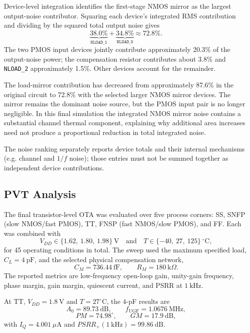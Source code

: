 Device-level integration identifies the first-stage NMOS mirror as the
largest output-noise contributor. Squaring each device's integrated
RMS contribution and dividing by the squared total output noise gives
\[
\underbrace{38.0\%}_{\texttt{NLOAD\_1}}+
\underbrace{34.8\%}_{\texttt{NLOAD\_0}}
\approx72.8\%.
\]
The two PMOS input devices jointly contribute approximately 20.3\%
of the output-noise power; the compensation resistor contributes about
3.8\% and \texttt{NLOAD\_2} approximately 1.5\%. Other devices
account for the remainder.

The load-mirror contribution has decreased from approximately 87.6\%
in the original circuit to 72.8\% with the selected larger NMOS
mirror devices. The mirror remains the dominant noise source, but the
PMOS input pair is no longer negligible. In this final simulation the
integrated NMOS mirror noise contains a substantial channel thermal
component, explaining why additional area increases need not produce
a proportional reduction in total integrated noise.

The noise ranking separately reports device totals and their internal
mechanisms (e.g. channel and $1/f$ noise); those entries must not be
summed together as independent device contributions.

\subsection{PVT Analysis}

The final transistor-level OTA was evaluated over five process corners:
SS, SNFP (slow NMOS/fast PMOS), TT, FNSP (fast NMOS/slow PMOS), and FF.
Each was combined with
\[
V_{DD}\in\{1.62,\ 1.80,\ 1.98\}~\mathrm{V}
\quad\text{and}\quad
T\in\{-40,\ 27,\ 125\}~^\circ\mathrm{C},
\]
for 45 operating conditions in total. The sweep used the maximum
specified load, $C_L=4~\mathrm{pF}$, and the selected physical
compensation network,
\[
C_M=736.44~\mathrm{fF},\qquad R_M=180~\mathrm{k}\Omega.
\]
The reported metrics are low-frequency open-loop gain, unity-gain
frequency, phase margin, gain margin, quiescent current, and PSRR at
$1~\mathrm{kHz}$.

At TT, $V_{DD}=1.8~\mathrm{V}$ and $T=27^\circ\mathrm{C}$, the
$4$-pF results are
\[
A_0=89.73~\mathrm{dB},\qquad
f_{\mathrm{UGF}}=1.0676~\mathrm{MHz},
\]
\[
PM=74.98^\circ,\qquad GM=17.9~\mathrm{dB},
\]
with $I_Q=4.001~\mu\mathrm{A}$ and
$PSRR_+(1~\mathrm{kHz})=99.86~\mathrm{dB}$.



